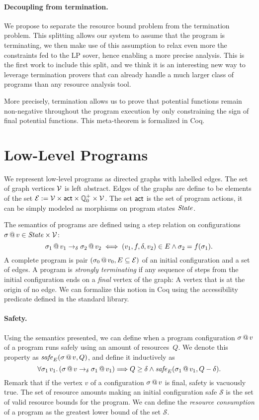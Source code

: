 \documentclass[nocopyrightspace,preprint]{sigplanconf-pldi15}
\begin{document}
\paragraph{Decoupling from termination.}
We
propose to separate the resource bound problem from the
termination problem.  This splitting allows our system
to assume that the program is terminating, we then make use
of this assumption to relax even more the constraints fed
to the LP sover, hence enabling a more precise analysis.
%
This is the first work to include this split, and we
think it is an interesting new way to leverage termination
provers that can already handle a much larger class of
programs than any resource analysis tool.

More precisely, termination allows us to prove that
potential functions remain non-negative throughout
the program execution by only constraining the sign of
final potential functions.  This meta-theorem is
formalized in Coq.


\section{Low-Level Programs}

We represent low-level programs as directed graphs with
labelled edges.  The set of graph vertices
$\mathcal V$ is left abstract.  Edges of the graphs
are define to be elements of the set
$\mathcal E := \mathcal V \times \mathsf{act} \times \mathbb Q^+_0 \times \mathcal V$.
The set $\mathsf{act}$ is the set of program actions, it
can be simply modeled as morphisms on program
states $\mathit{State}$.

The semantics of programs are defined using a step relation on
configurations $\sigma\,@\,v \in \mathit{State} \times \mathcal V$:
$$
\sigma_1\,@\,v_1 \to_\delta \sigma_2\,@\,v_2
  \iff
(v_1, f, \delta, v_2) \in E  \land  \sigma_2 = f(\sigma_1).
$$
A complete program is pair $(\sigma_0\,@\,v_0, E \subseteq \mathcal E)$
of an initial configuration and a set of edges.  A program is
\emph{strongly terminating} if any sequence of steps
from the initial configuration ends on a \emph{final} vertex
of the graph:
A vertex that is at the origin of no edge.
We can formalize this notion in Coq
using the accessibility predicate defined in the
standard library.

\paragraph{Safety.} Using the semantics presented, we can define
when a program configuration $\sigma\,@\,v$ of a program runs
safely using an amount of resources~$Q$.  We denote this property
as $\mathit{safe}_E(\sigma\,@\,v, Q)$, and define it inductively as
$$
\forall \sigma_1\, v_1.\, (\sigma\,@\,v \to_\delta \sigma_1\,@\,v_1) {\implies}
  Q \ge \delta \land \mathit{safe}_E(\sigma_1\,@\,v_1, Q-\delta).
$$
Remark that if the vertex $v$ of a configuration $\sigma\,@\,v$ is
final, safety is vacuously true.  The set of resource amounts
making an initial configuration safe $\mathcal S$ is the set of
valid resource bounds for the program.  We can define the
\emph{resource consumption} of a program as the greatest lower
bound of the set $\mathcal S$.
\end{document}
